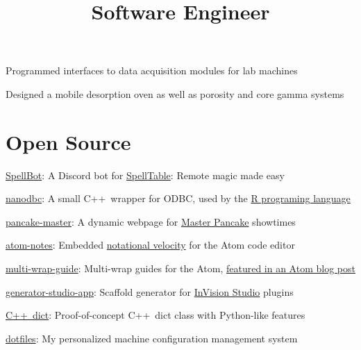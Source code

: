 \documentclass[12pt, tweaklist, line]{res}
\let\tempone\itemize
\let\temptwo\enditemize
\renewenvironment{itemize}{\tempone\vspace{-.15in}\setlength{\topsep}{0pt}\setlength{\itemsep}{3pt}\vspace{-.15in}}{\temptwo}
\def\Cplusplus{C++}
\begin{document}
\begin{resume}
\title{Software Engineer}
\begin{position}
\begin{itemize}
\item Programmed interfaces to data acquisition modules for lab machines
\item Designed a mobile desorption oven as well as porosity and core gamma systems
\end{itemize}
\end{position}

\vspace{-.08in}
\section{Open Source}
\begin{itemize}
\vspace{.55in} %
\item \href{https://spellbot.io}{SpellBot}: A Discord bot for \href{https://spelltable.com}{SpellTable}: Remote magic made easy
\item \href{http://nanodbc.io}{nanodbc}: A small \Cplusplus~wrapper for ODBC, used by the \href{https://github.com/r-dbi/odbc}{R programing language}
\item \href{http://pancake.lexicalunit.com}{pancake-master}: A dynamic webpage for \href{https://drafthouse.com/series/master-pancake}{Master Pancake} showtimes
\item \href{https://github.com/lexicalunit/atom-notes}{atom-notes}: Embedded \href{http://notational.net/}{notational velocity} for the Atom code editor
\item \href{https://atom.io/packages/multi-wrap-guide}{multi-wrap-guide}: Multi-wrap guides for the Atom, \href{http://blog.atom.io/2015/08/06/new-package-roundup.html}{featured in an Atom blog post}
\item \href{https://www.npmjs.com/package/generator-studio-app}{generator-studio-app}: Scaffold generator for \href{https://www.invisionapp.com/studio}{InVision Studio} plugins
\item \href{https://github.com/lexicalunit/dict}{\Cplusplus~dict}: Proof-of-concept \Cplusplus~dict class with Python-like features
\item \href{https://github.com/lexicalunit/dotfiles}{dotfiles}: My personalized machine configuration management system
\end{itemize}


\end{resume}
\end{document}
